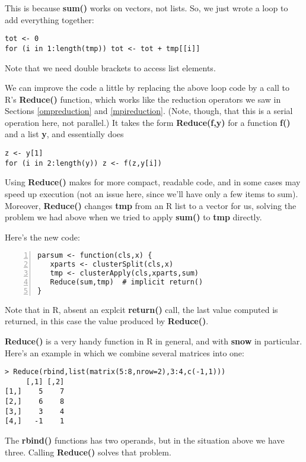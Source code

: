 This is because {\bf sum()} works on vectors, not lists.  So, we just
wrote a loop to add everything together:

\begin{lstlisting}
tot <- 0
for (i in 1:length(tmp)) tot <- tot + tmp[[i]]
\end{lstlisting}

Note that we need double brackets to access list elements.

We can improve the code a little by replacing the above loop code by a
call to R's {\bf Reduce()} function, which works like the reduction
operators we saw in Sections \ref{ompreduction} and \ref{mpireduction}.
(Note, though, that this is a serial operation here, not parallel.)
It takes the form {\bf Reduce(f,y)} for a function {\bf f()} and a list
{\bf y}, and essentially does

\begin{lstlisting}
z <- y[1]
for (i in 2:length(y)) z <- f(z,y[i]) 
\end{lstlisting}

Using {\bf Reduce()} makes for more compact, readable code, and in some
cases may speed up execution (not an issue here, since we'll have only a
few items to sum).  Moreover, {\bf Reduce()} changes {\bf tmp} from an R
list to a vector for us, solving the problem we had above when we tried
to apply {\bf sum()} to {\bf tmp} directly.

Here's the new code:

\begin{lstlisting}[numbers=left]
parsum <- function(cls,x) {
   xparts <- clusterSplit(cls,x)
   tmp <- clusterApply(cls,xparts,sum)
   Reduce(sum,tmp)  # implicit return()
}
\end{lstlisting}

Note that in R, absent an explcit {\bf return()} call, the last value
computed is returned, in this case the value produced by {\bf Reduce()}.

{\bf Reduce()} is a very handy function in R in general, and with {\bf
snow} in particular.  Here's an example in which we combine several
matrices into one:

\begin{lstlisting}
> Reduce(rbind,list(matrix(5:8,nrow=2),3:4,c(-1,1)))
     [,1] [,2]
[1,]    5    7
[2,]    6    8
[3,]    3    4
[4,]   -1    1
\end{lstlisting}

The {\bf rbind()} functions has two operands, but in the situation above
we have three.  Calling {\bf Reduce()} solves that problem.

